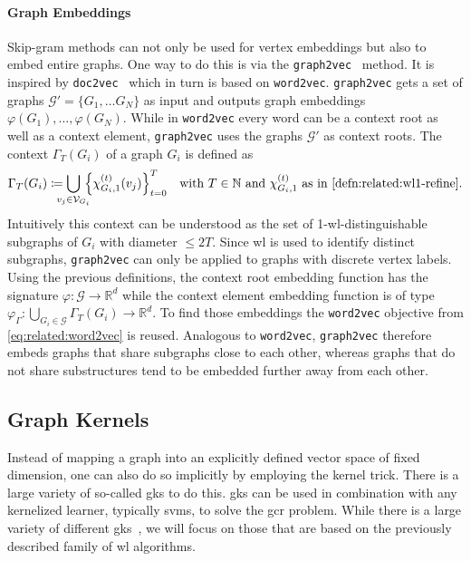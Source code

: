 \paragraph{Graph Embeddings}
Skip-gram methods can not only be used for vertex embeddings but also to embed entire graphs.
One way to do this is via the \texttt{graph2vec}~\cite{Narayanan2017} method.
It is inspired by \texttt{doc2vec}~\cite{Le2014} which in turn is based on \texttt{word2vec}.
\texttt{graph2vec} gets a set of graphs $\mathcal{G}' = \{ G_1, \dots G_N \}$ as input and outputs graph embeddings $\varphi(G_1), \dots, \varphi(G_N)$.
While in \texttt{word2vec} every word can be a context root as well as a context element, \texttt{graph2vec} uses the graphs $\mathcal{G}'$ as context roots.
The context $\Gamma_T(G_i)$ of a graph $G_i$ is defined as
\begin{equation}\label{eq:related:graph2vec}
	\Gamma_T(G_i) \coloneqq \bigcup_{\mathclap{v_j \in \mathcal{V}_{G_i}}}\, {\left\{ \chi_{G_i, 1}^{(t)}(v_j) \right\}}_{t = 0}^T %
	\quad\text{with $T \in \mathbb{N}$ and $\chi_{G_i, 1}^{(t)}$ as in \cref{defn:related:wl1-refine}.}
\end{equation}
Intuitively this context can be understood as the set of 1-\acs{wl}-distinguishable subgraphs of $G_i$ with diameter $\leq 2T$.
Since \ac{wl} is used to identify distinct subgraphs, \texttt{graph2vec} can only be applied to graphs with discrete vertex labels.
Using the previous definitions, the context root embedding function has the signature $\varphi: \mathcal{G} \to \mathbb{R}^d$ while the context element embedding function is of type $\varphi_{\Gamma}: \bigcup_{G_i \in \mathcal{G}} \Gamma_T(G_i) \to \mathbb{R}^d$.
To find those embeddings the \texttt{word2vec} objective from \cref{eq:related:word2vec} is reused.
Analogous to \texttt{word2vec}, \texttt{graph2vec} therefore embeds graphs that share subgraphs close to each other, whereas graphs that do not share substructures tend to be embedded further away from each other.

\subsection{Graph Kernels}%
\label{sec:related:gcr:kernel}

Instead of mapping a graph into an explicitly defined vector space of fixed dimension, one can also do so implicitly by employing the kernel trick.
There is a large variety of so-called \acp{gk} to do this.
\acp{gk} can be used in combination with any kernelized learner, typically \acp{svm}, to solve the \ac{gcr} problem.
While there is a large variety of different \acp{gk}~\cite{Kriege2020}, we will focus on those that are based on the previously described family of \ac{wl} algorithms.

